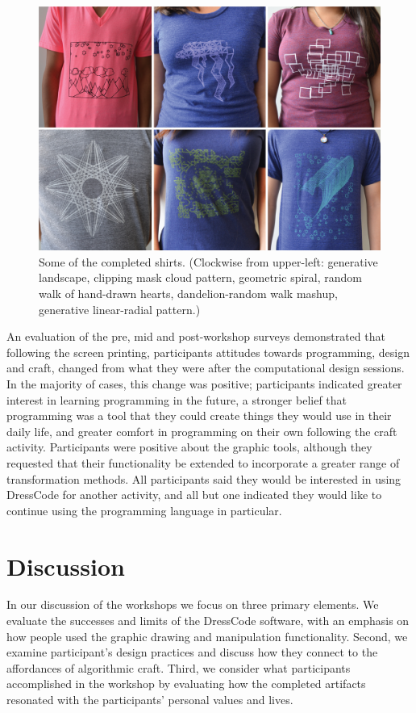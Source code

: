 \documentclass{sigchi}
\begin{document}
\begin{center}
\begin{figure}[h!]
\includegraphics[width=\columnwidth]{images/shirt_results.jpg}
\caption{Some of the completed shirts. (Clockwise from upper-left: generative landscape, clipping mask cloud pattern, geometric spiral, random walk of hand-drawn hearts, dandelion-random walk mashup, generative linear-radial pattern.) }
\label{fig:screen_results}
\end{figure}
\end{center}
\vspace{-20pt}

An evaluation of the pre, mid and post-workshop surveys demonstrated that following the screen printing, participants attitudes towards programming, design and craft, changed from what they were after the computational design sessions. In the majority of cases, this change was positive; participants indicated greater interest in learning programming in the future, a stronger belief that programming was a tool that they could create things they would use in their daily life, and greater comfort in programming on their own following the craft activity. Participants were positive about the graphic tools, although they requested that their functionality be extended to incorporate a greater range of transformation methods. All participants said they would be interested in using DressCode for another activity, and all but one indicated they would like to continue using the programming language in particular.

\section{Discussion}
In our discussion of the workshops we focus on three primary elements. We evaluate the successes and limits of the DressCode software, with an emphasis on how people used the graphic drawing and manipulation functionality. Second, we examine participant's design practices and discuss how they connect to the affordances of algorithmic craft. Third, we consider what participants accomplished in the workshop by evaluating how the completed artifacts resonated with the participants' personal values and lives.
\end{document}
